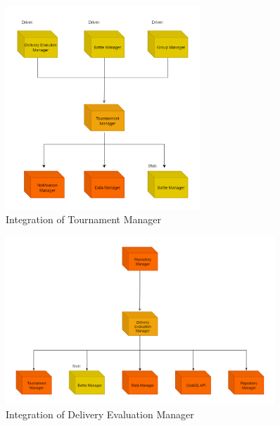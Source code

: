 \documentclass[../DD.tex]{subfiles}
\begin{document}
        \begin{figure}[h!]
            \centering
            \hspace*{-1cm}
            \includegraphics[width=0.65\textwidth]{../assets/section_5/5.png}
            \caption{Integration of Tournament Manager}
        \end{figure}

        \begin{figure}[h!]
            \centering
            \hspace*{-1cm}
            \includegraphics[width=0.9\textwidth]{../assets/section_5/6.png}
            \caption{Integration of Delivery Evaluation Manager}
        \end{figure}
        \newpage
\end{document}
